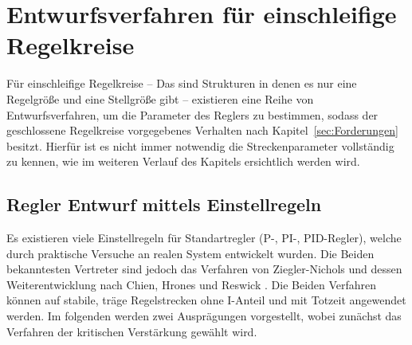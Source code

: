 \section{Entwurfsverfahren für einschleifige Regelkreise}
%
Für einschleifige Regelkreise -- Das sind Strukturen in denen es nur eine Regelgröße und eine Stellgröße gibt -- existieren eine Reihe von Entwurfsverfahren, um die Parameter des Reglers zu bestimmen, sodass der geschlossene Regelkreise vorgegebenes Verhalten nach Kapitel~\ref{sec:Forderungen} besitzt. Hierfür ist es nicht immer notwendig die Streckenparameter vollständig zu kennen, wie im weiteren Verlauf des Kapitels ersichtlich werden wird.
%
%
\subsection{Regler Entwurf mittels Einstellregeln}
%
Es existieren viele Einstellregeln für Standartregler (P-, PI-, PID-Regler), welche durch praktische Versuche an realen System entwickelt wurden. Die Beiden bekanntesten Vertreter sind jedoch das Verfahren von Ziegler-Nichols und dessen Weiterentwicklung nach Chien, Hrones und Reswick \cite{Foellinger94, MSF05, Lunze10}. Die Beiden Verfahren können auf stabile, träge Regelstrecken ohne I-Anteil und mit Totzeit angewendet werden. Im folgenden werden zwei Ausprägungen vorgestellt, wobei zunächst das Verfahren der kritischen Verstärkung gewählt wird. 
%
